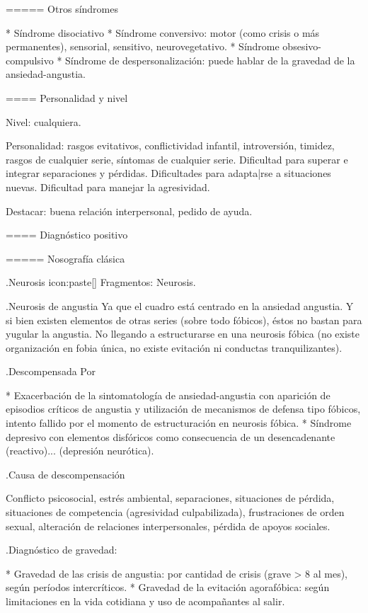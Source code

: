 \documentclass{scrbook}
\begin{document}
===== Otros síndromes

* Síndrome disociativo
* Síndrome conversivo: motor (como crisis o más permanentes), sensorial, sensitivo, neurovegetativo.
* Síndrome obsesivo-compulsivo
* Síndrome de despersonalización: puede hablar de la gravedad de la ansiedad-angustia.

==== Personalidad y nivel

Nivel: cualquiera.

Personalidad: rasgos evitativos, conflictividad infantil, introversión, timidez, rasgos de cualquier serie, síntomas de cualquier serie. Dificultad para superar e integrar separaciones y pérdidas. Dificultades para adapta|rse a situaciones nuevas. Dificultad para manejar la agresividad.

Destacar: buena relación interpersonal, pedido de ayuda.

==== Diagnóstico positivo

===== Nosografía clásica

.Neurosis
icon:paste[] Fragmentos: Neurosis.

.Neurosis de angustia
Ya que el cuadro está centrado en la ansiedad angustia. Y si bien existen elementos de otras series (sobre todo fóbicos), éstos no bastan para yugular la angustia. No llegando a estructurarse en una neurosis fóbica (no existe organización en fobia única, no existe evitación ni conductas tranquilizantes).

.Descompensada
Por

* Exacerbación de la sintomatología de ansiedad-angustia con aparición de episodios críticos de angustia y utilización de mecanismos de defensa tipo fóbicos, intento fallido por el momento de estructuración en neurosis fóbica.
* Síndrome depresivo con elementos disfóricos como consecuencia de un desencadenante (reactivo)... (depresión neurótica).

.Causa de descompensación

Conflicto psicosocial, estrés ambiental, separaciones, situaciones de pérdida, situaciones de competencia (agresividad culpabilizada), frustraciones de orden sexual, alteración de relaciones interpersonales, pérdida de apoyos sociales.

.Diagnóstico de gravedad:

* Gravedad de las crisis de angustia: por cantidad de crisis (grave > 8 al mes), según períodos intercríticos.
* Gravedad de la evitación agorafóbica: según limitaciones en la vida cotidiana y uso de acompañantes al salir.
\end{document}
